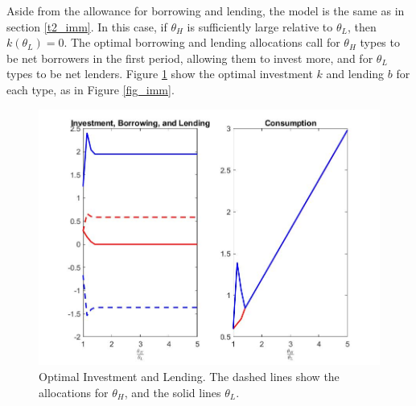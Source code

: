 \documentclass[11pt]{article}
\begin{document}
Aside from the allowance for borrowing and lending, the model is the same as in section \ref{t2_imm}. In this case, if \( \theta_H \) is sufficiently large relative to \( \theta_L \), then \( k(\theta_L) = 0 \). The optimal borrowing and lending allocations call for \( \theta_H \) types to be net borrowers in the first period, allowing them to invest more, and for \( \theta_L \) types to be net lenders. Figure \ref{fig_mob} show the optimal investment \( k \) and lending \( b \) for each type, as in Figure \ref{fig_imm}. 

\begin{figure}[!ht]
    \centering
    \includegraphics[scale = 0.5]{figures/mob.jpg}
    \caption{Optimal Investment and Lending. The dashed lines show the allocations for \( \theta_H \), and the solid lines \( \theta_L \).}
    \label{fig_mob}
\end{figure}
\end{document}
